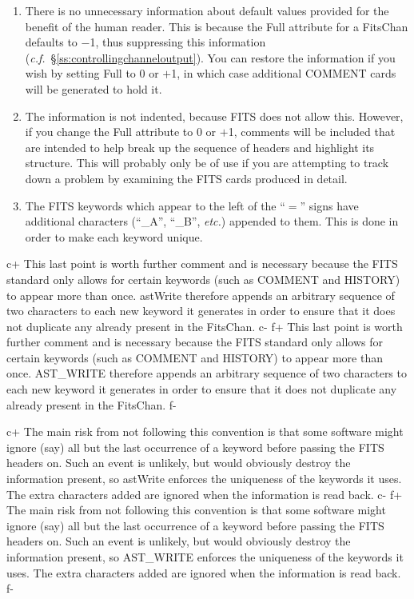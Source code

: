 \documentclass[twoside,11pt]{article}
\newcommand{\secref}[1]{\S\ref{#1}}
\newcommand{\secref}[1]{\ref{#1}}
\begin{document}
\begin{enumerate}
\item There is no unnecessary information about default values
provided for the benefit of the human reader. This is because the Full
attribute for a FitsChan defaults to $-$1, thus suppressing this
information ({\em{c.f.}}~\secref{ss:controllingchanneloutput}). You
can restore the information if you wish by setting Full to 0 or $+$1,
in which case additional COMMENT cards will be generated to hold it.

\item The information is not indented, because FITS does not allow
this. However, if you change the Full attribute to 0 or $+$1, comments
will be included that are intended to help break up the sequence of
headers and highlight its structure. This will probably only be of use
if you are attempting to track down a problem by examining the FITS
cards produced in detail.

\item The FITS keywords which appear to the left of the ``$=$'' signs
have additional characters (``\_A'', ``\_B'', {\em{etc.}}) appended to
them. This is done in order to make each keyword unique.
\end{enumerate}

c+
This last point is worth further comment and is necessary because the
FITS standard only allows for certain keywords (such as COMMENT and
HISTORY) to appear more than once. astWrite therefore appends an
arbitrary sequence of two characters to each new keyword it generates
in order to ensure that it does not duplicate any already present in
the FitsChan.
c-
f+
This last point is worth further comment and is necessary because the
FITS standard only allows for certain keywords (such as COMMENT and
HISTORY) to appear more than once. AST\_WRITE therefore appends an
arbitrary sequence of two characters to each new keyword it generates
in order to ensure that it does not duplicate any already present in
the FitsChan.
f-

c+
The main risk from not following this convention is that some software
might ignore (say) all but the last occurrence of a keyword before
passing the FITS headers on. Such an event is unlikely, but would
obviously destroy the information present, so astWrite enforces the
uniqueness of the keywords it uses. The extra characters added are
ignored when the information is read back.
c-
f+
The main risk from not following this convention is that some software
might ignore (say) all but the last occurrence of a keyword before
passing the FITS headers on. Such an event is unlikely, but would
obviously destroy the information present, so AST\_WRITE enforces the
uniqueness of the keywords it uses. The extra characters added are
ignored when the information is read back.
f-
\end{document}
